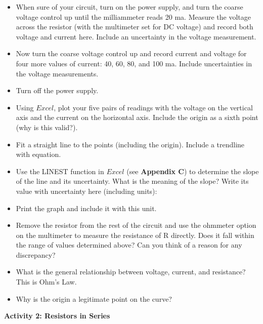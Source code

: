 \begin{itemize}
\item When sure of your circuit, turn on the power supply, and turn the coarse 
voltage control up until the milliammeter reads 20 ma. Measure the voltage 
across the resistor (with the multimeter set for DC voltage) and record both voltage and current here. Include an uncertainty in the voltage measurement.
\vspace{10mm}


\item Now turn the coarse voltage control up and record current and voltage 
for four more values of current: 40, 60, 80, and 100 ma. Include uncertainties
 in the voltage measurements.
\vspace{30mm}

\item Turn off the power supply.

\item Using $Excel$, plot your five pairs of readings with the voltage on the 
vertical axis and the current on the horizontal axis. Include the origin as a 
sixth point (why is this valid?).
\vspace{6mm}
\item Fit a straight line to the points (including the origin).
Include a trendline with equation.
\item Use the LINEST function in $Excel$ (see \textbf{Appendix C}) to 
determine the slope of the line and its uncertainty.  What is the meaning 
of the slope? Write its value with uncertainty here (including units):
\vspace{20mm}

\item Print the graph and include it with this unit.

\item Remove the resistor from the rest of the circuit and use the ohmmeter
option on the multimeter to measure the resistance of R directly.
Does it fall within the range of values determined above? Can you think of 
a reason for any discrepancy?
\vspace{20mm}

\item What is the general relationship between voltage, current, and resistance?
This is Ohm's Law.\vspace{15mm}

\item Why is the origin a legitimate point on the curve?\vspace{15mm}

\end{itemize}
\textbf{Activity 2: Resistors in Series}

